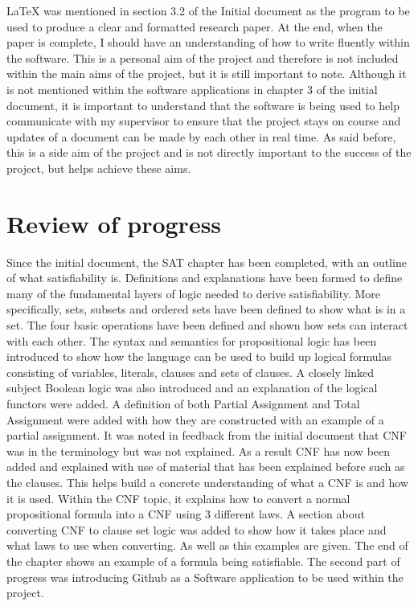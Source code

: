\documentclass[11pt,a4paper]{article}
\begin{document}
LaTeX was mentioned in section 3.2 of the Initial document as the program to be used to produce a clear and formatted research paper. At the end, when the paper is complete, I should have an understanding of how to write fluently within the software. This is a personal aim of the project and therefore is not included within the main aims of the project, but it is still important to note. Although it is not mentioned within the software applications in chapter 3 of the initial document, it is important to understand that the software is being used to help communicate with my supervisor to ensure that the project stays on course and updates of a document can be made by each other in real time. As said before, this is a side aim of the project and is not directly important to the success of the project, but helps achieve these aims.  

\section{Review of progress}
Since the initial document, the SAT chapter has been completed, with an outline of what satisfiability is. Definitions and explanations have been formed to define many of the fundamental layers of logic needed to derive satisfiability. More specifically, sets, subsets and ordered sets have been defined to show what is in a set. The four basic operations have been defined and shown how sets can interact with each other. The syntax and semantics for propositional logic has been introduced to show how the language can be used to build up logical formulas consisting of variables, literals, clauses and sets of clauses. A closely linked subject Boolean logic was also introduced and an explanation of the logical functors were added. A definition of both Partial Assignment and Total Assignment were added with how they are constructed with an example of a partial assignment. It was noted in feedback from the initial document that CNF was in the terminology but was not explained. As a result CNF has now been added and explained with use of material that has been explained before such as the clauses. This helps build a concrete understanding of what a CNF is and how it is used. Within the CNF topic, it explains how to convert a normal propositional formula into a CNF using 3 different laws. A section about converting CNF to clause set logic was added to show how it takes place and what laws to use when converting. As well as this examples are given. The end of the chapter shows an example of a formula being satisfiable. 
The second part of progress was introducing Github as a Software application to be used within the project. 
\end{document}
